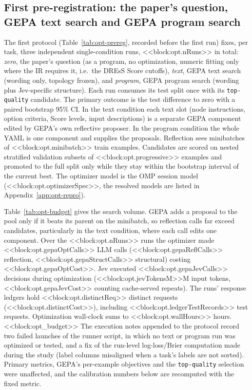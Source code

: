 \subsection{First pre-registration: the paper's question, GEPA text search and GEPA program search}\label{app:opt-v1}
The first protocol (Table~\ref{tab:opt-prereg}, recorded before the first run) fixes, per task, three independent single-condition runs, <<block:opt.nRuns>> in total: \emph{zero}, the paper's question (as a \jevopt{} program, no optimization, numeric fitting only where the IR requires it, i.e.\ the DREsS Score cutoffs), \emph{text}, GEPA text search (wording only, topology frozen), and \emph{program}, GEPA program search (wording plus Jev-specific structure). Each run consumes its test split once with its \texttt{top-quality} candidate. The primary outcome is the test difference to zero with a paired bootstrap 95\% CI. In the text condition each text slot (node instructions, option criteria, Score levels, input descriptions) is a separate GEPA component edited by GEPA's own reflective proposer. In the program condition the whole YAML is one component and \jevopt{} supplies the proposals. Reflection sees minibatches of <<block:opt.minibatch>> train examples. Candidates are scored on nested stratified validation subsets of <<block:opt.progressive>> examples and promoted to the full split only while they stay within the bootstrap interval of the current best. The optimizer model is the OMP session model (<<block:opt.optimizerSpec>>, the resolved models are listed in Appendix~\ref{app:opt-repro}).

Table~\ref{tab:opt-budget} gives the search volume. GEPA adds a proposal to the pool only if it beats its parent on the minibatch, so reflection calls far exceed candidates, particularly in the text condition, where each call edits one component. Over the <<block:opt.nRuns>> runs the optimizer made <<block:opt.gepaOptCalls>> LLM calls (<<block:opt.gepaReflCalls>> reflection, <<block:opt.gepaStructCalls>> structural) costing <<block:opt.gepaOptCost>>. Jev executed <<block:opt.gepaJevCalls>> decisions during optimization (<<block:opt.jevTokensM>>M input tokens, <<block:opt.gepaJevCost>> counting cache-served repeats). The runs' response ledgers hold <<block:opt.distinctReq>> distinct requests (<<block:opt.distinctCost>>), including <<block:opt.ledgerTestRecords>> test requests. Optimization wall-clock sums to <<block:opt.wallHours>> hours.
<<block:opt_budget>>
The execution notes appended to the protocol record two failed launches of the runner script, in which no text or program run was optimized or tested, and a fix of the run-level log-loss/Brier computation made during the study (label columns misaligned when a task's labels are not sorted). Primary metrics, GEPA's per-example objectives and the \texttt{top-quality} selection were unaffected, and the calibration numbers below are recomputed with the fixed metric.

